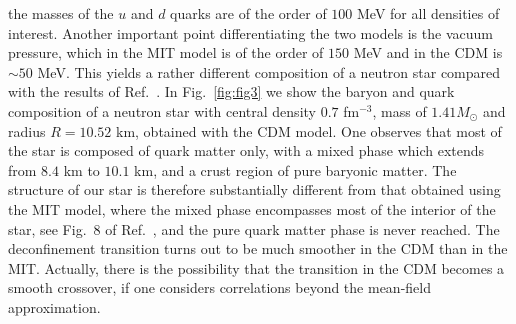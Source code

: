 the masses of the $u$ and $d$ quarks are of the order of $100$ MeV
for all densities of interest. Another important point differentiating
the two models is the vacuum pressure, which in the MIT model is of the
order of $150$ MeV and in the CDM is $\sim 50$ MeV. 
This yields a
rather different composition of a neutron star compared with the
results of Ref.\ \cite{glen}. In Fig.\ \ref{fig:fig3}
we show the baryon and quark composition of a neutron star
with central density $0.7$ fm$^{-3}$, mass of 
$1.41 M_{\odot}$ and radius $R=10.52$ km, obtained with the CDM model.
One observes that most of the star is
composed of quark matter only, with a mixed phase which
extends from $8.4$ km to  $10.1$ km, and a crust region of pure
baryonic matter. The structure of our star is therefore substantially
different from that obtained using the MIT model, where
the mixed phase encompasses most of the interior of the star, see
Fig.\ 8 of Ref.\ \cite{glen}, and the pure  quark matter phase is
never reached. The deconfinement transition turns out to be much
smoother in the CDM than in the MIT. Actually, there is the possibility that
the transition in the CDM becomes a smooth crossover, if one
considers correlations beyond the mean-field approximation\cite{rinaldo}.

